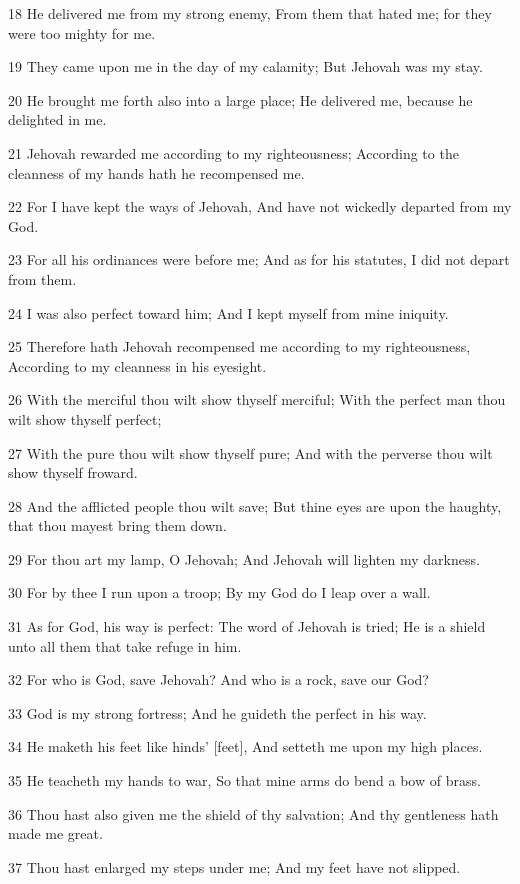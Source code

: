 \par 18 He delivered me from my strong enemy, From them that hated me; for they were too mighty for me.
\par 19 They came upon me in the day of my calamity; But Jehovah was my stay.
\par 20 He brought me forth also into a large place; He delivered me, because he delighted in me.
\par 21 Jehovah rewarded me according to my righteousness; According to the cleanness of my hands hath he recompensed me.
\par 22 For I have kept the ways of Jehovah, And have not wickedly departed from my God.
\par 23 For all his ordinances were before me; And as for his statutes, I did not depart from them.
\par 24 I was also perfect toward him; And I kept myself from mine iniquity.
\par 25 Therefore hath Jehovah recompensed me according to my righteousness, According to my cleanness in his eyesight.
\par 26 With the merciful thou wilt show thyself merciful; With the perfect man thou wilt show thyself perfect;
\par 27 With the pure thou wilt show thyself pure; And with the perverse thou wilt show thyself froward.
\par 28 And the afflicted people thou wilt save; But thine eyes are upon the haughty, that thou mayest bring them down.
\par 29 For thou art my lamp, O Jehovah; And Jehovah will lighten my darkness.
\par 30 For by thee I run upon a troop; By my God do I leap over a wall.
\par 31 As for God, his way is perfect: The word of Jehovah is tried; He is a shield unto all them that take refuge in him.
\par 32 For who is God, save Jehovah? And who is a rock, save our God?
\par 33 God is my strong fortress; And he guideth the perfect in his way.
\par 34 He maketh his feet like hinds' [feet], And setteth me upon my high places.
\par 35 He teacheth my hands to war, So that mine arms do bend a bow of brass.
\par 36 Thou hast also given me the shield of thy salvation; And thy gentleness hath made me great.
\par 37 Thou hast enlarged my steps under me; And my feet have not slipped.
